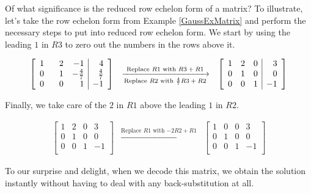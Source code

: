 \documentclass{ximera}
\begin{document}

\smallskip

Of what significance is the reduced row echelon form of a matrix?  To illustrate, let's take the row echelon form from Example \ref{GaussExMatrix} and perform the necessary steps to put into reduced row echelon form.  We start by using the leading $1$ in $R3$ to zero out the numbers in the rows above it.

\[ \begin{array}{ccc}

\left[ \begin{array}{rrr|r} 
1 & \hphantom{-}2 & -1 & 4 \\ 
0 & 1 & -\frac{4}{7} & \frac{4}{7} \\ 
0 & 0 &1 & -1 \\ 
\end{array} \right]  
& 
\xrightarrow[\text{Replace $R2$ with $\frac{4}{7} R3 + R2$}]{\text{Replace $R1$ with $R3+R1$}} 
& 
\left[ \begin{array}{rrr|r} 
1 & 2 & 0 & 3 \\ 
0 & 1 & 0 & 0 \\ 
0 & 0 &1 & -1 \\ 
\end{array} \right]  

\end{array}\]

Finally, we take care of the $2$ in $R1$ above the leading $1$ in $R2$.

\[ \begin{array}{ccc}

\left[ \begin{array}{rrr|r} 
1 & 2 & 0 & 3 \\ 
0 & 1 & 0 & 0 \\ 
0 & 0 &1 & -1 \\ 
\end{array} \right]   
& 
\xrightarrow{\text{Replace $R1$ with $-2R2+R1$}}
& 
\left[ \begin{array}{rrr|r} 
1 & 0 & 0 & 3 \\ 
0 & 1 & 0 & 0 \\ 
0 & 0 &1 & -1 \\ 
\end{array} \right]  

\end{array}\]

To our surprise and delight, when we decode this matrix, we obtain the solution instantly without having to deal with any back-substitution at all.
\end{document}
